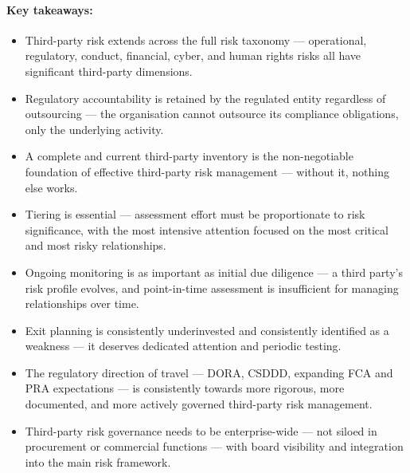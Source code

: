 \paragraph{Key takeaways:}
\begin{itemize}
  \item{Third-party risk extends across the full risk taxonomy — operational, regulatory, conduct, financial, cyber, and human rights risks all have significant third-party dimensions.}
  \item{Regulatory accountability is retained by the regulated entity regardless of outsourcing — the organisation cannot outsource its compliance obligations, only the underlying activity.}
  \item{A complete and current third-party inventory is the non-negotiable foundation of effective third-party risk management — without it, nothing else works.}
  \item{Tiering is essential — assessment effort must be proportionate to risk significance, with the most intensive attention focused on the most critical and most risky relationships.}
  \item{Ongoing monitoring is as important as initial due diligence — a third party's risk profile evolves, and point-in-time assessment is insufficient for managing relationships over time.}
  \item{Exit planning is consistently underinvested and consistently identified as a weakness — it deserves dedicated attention and periodic testing.}
  \item{The regulatory direction of travel — DORA, CSDDD, expanding FCA and PRA expectations — is consistently towards more rigorous, more documented, and more actively governed third-party risk management.}
  \item{Third-party risk governance needs to be enterprise-wide — not siloed in procurement or commercial functions — with board visibility and integration into the main risk framework.}
\end{itemize}


